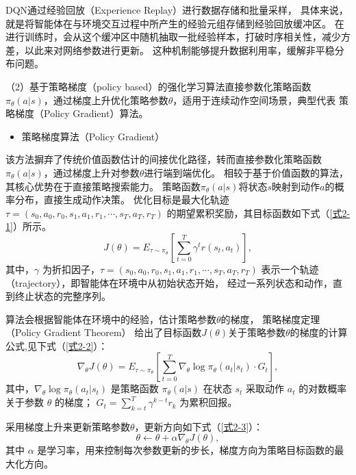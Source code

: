 DQN通过经验回放（Experience Replay）进行数据存储和批量采样，
具体来说，就是将智能体在与环境交互过程中所产生的经验元组存储到经验回放缓冲区。
在进行训练时，会从这个缓冲区中随机抽取一批经验样本，打破时序相关性，减少方差，以此来对网络参数进行更新。
这种机制能够提升数据利用率，缓解非平稳分布问题。


（2）基于策略梯度（policy based）的强化学习算法直接参数化策略函数
$\pi_{\theta}(a|s)$，通过梯度上升优化策略参数$θ$，适用于连续动作空间场景，典型代表
策略梯度（Policy Gradient）算法\cite{sutton1999policy}。

\begin{itemize}
    \item 策略梯度算法（Policy Gradient）
\end{itemize}

该方法摒弃了传统价值函数估计的间接优化路径，转而直接参数化策略函数
$\pi_{\theta}(a|s)$，通过梯度上升对参数$\theta$进行端到端优化。
相较于基于价值函数的算法，其核心优势在于直接策略搜索能力。
策略函数$\pi_{\theta}(a|s)$将状态$s$映射到动作$a$的概率分布，直接生成动作决策。
优化目标是最大化轨迹$\tau = (s_0, a_0, r_0, s_1, a_1, r_1, \cdots, s_T, a_T, r_T)$ 
的期望累积奖励，其目标函数如下式（\ref{式2-1}）所示。
\begin{equation}\label{式2-1}
    J(\theta) = E_{\tau \sim \pi_{\theta}} \left[ \sum_{t = 0}^{T} \gamma ^ t r(s_t, a_t) \right],
\end{equation}
其中，$\gamma $ 为折扣因子，$\tau = (s_0, a_0, r_0, s_1, a_1, r_1, \cdots, s_T, a_T, r_T)$ 
表示一个轨迹（trajectory），即智能体在环境中从初始状态开始，
经过一系列状态和动作，直到终止状态的完整序列。

算法会根据智能体在环境中的经验，估计策略参数$\theta$的梯度，
策略梯度定理（Policy Gradient Theorem）
给出了目标函数$J(\theta)$关于策略参数$\theta$的梯度的计算公式,见下式（\ref{式2-2}）：
\begin{equation}\label{式2-2}
    \nabla_{\theta} J(\theta) = E_{\tau \sim \pi_{\theta}} \left[ \sum_{t = 0}^{T} \nabla_{\theta} \log \pi_{\theta}(a_t|s_t)\cdot  G_t \right],
\end{equation}
其中，$\nabla_{\theta} \log \pi_{\theta}(a_t|s_t)$ 
是策略函数 $\pi_{\theta}(a|s)$ 在状态 $s_t$ 采取动作 $a_t$ 的对数概率关于参数
$\theta$ 的梯度；
$G_t = \sum _{k=t}^T \gamma ^{k-t}r_k$ 为累积回报。 

采用梯度上升来更新策略参数$\theta$，更新方向如下式（\ref{式2-3}）：
\begin{equation}\label{式2-3}
    \theta \leftarrow \theta + \alpha \nabla_{\theta} J(\theta),
\end{equation}
其中 $\alpha$ 是学习率，用来控制每次参数更新的步长，梯度方向为策略目标函数的最大化方向。


